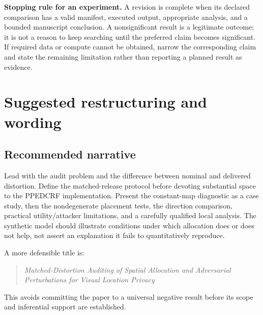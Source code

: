 \documentclass[11pt,a4paper]{article}
\begin{document}
\textbf{Stopping rule for an experiment.} A revision is complete when its declared comparison has a valid manifest, executed output, appropriate analysis, and a bounded manuscript conclusion. A nonsignificant result is a legitimate outcome; it is not a reason to keep searching until the preferred claim becomes significant. If required data or compute cannot be obtained, narrow the corresponding claim and state the remaining limitation rather than reporting a planned result as evidence.

\section{Suggested restructuring and wording}

\subsection{Recommended narrative}
Lead with the audit problem and the difference between nominal and delivered distortion. Define the matched-release protocol before devoting substantial space to the PPEDCRF implementation. Present the constant-map diagnostic as a case study, then the nondegenerate placement tests, the direction comparison, practical utility/attacker limitations, and a carefully qualified local analysis. The synthetic model should illustrate conditions under which allocation does or does not help, not assert an explanation it fails to quantitatively reproduce.

A more defensible title is:
\begin{quote}
\emph{Matched-Distortion Auditing of Spatial Allocation and Adversarial Perturbations for Visual Location Privacy}
\end{quote}
This avoids committing the paper to a universal negative result before its scope and inferential support are established.
\end{document}
